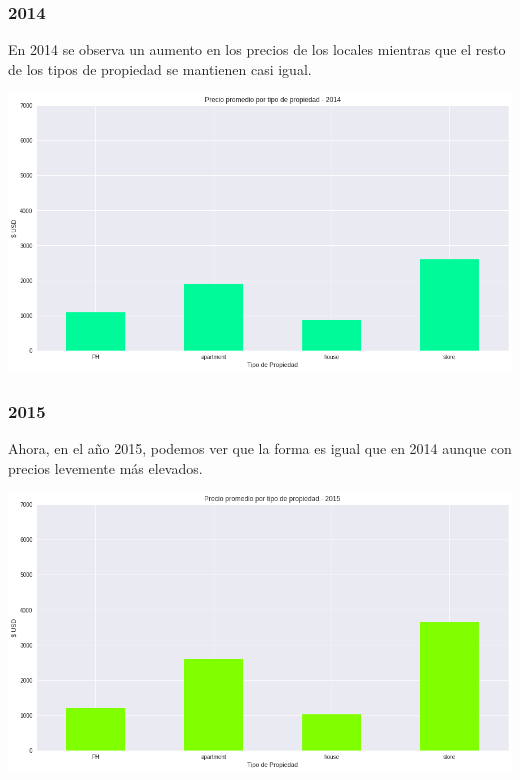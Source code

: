 \documentclass[a4paper, 10pt]{article}
\begin{document}
				\subsubsection{2014}
					En 2014 se observa un aumento en los precios de los locales mientras que el resto de los tipos de propiedad
					se mantienen casi igual.
					\begin{center}
   		    				\includegraphics[width=\textwidth]{images/propPrice2014}
				  	\end{center}
				\subsubsection{2015}
					Ahora, en el año 2015, podemos ver que la forma es igual que en 2014 aunque con precios levemente más elevados.
					\begin{center}
   		    				\includegraphics[width=\textwidth]{images/propPrice2015}
				  	\end{center}
\end{document}
